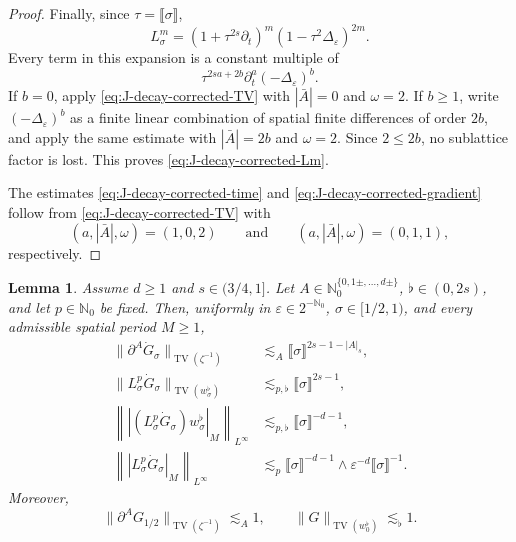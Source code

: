 \documentclass{article}
\numberwithin{equation}{section}
\theoremstyle{plain}
\newtheorem{lemma}[theorem]{Lemma}
\theoremstyle{definition}
\begin{document}
\begin{proof}
	Finally, since \(\tau=\llbracket\sigma\rrbracket\),
	\[
	L_\sigma^m
	=(1+\tau^{2s}\partial_t)^m
	(1-\tau^2\Delta_\varepsilon)^{2m}.
	\]
	Every term in this expansion is a constant multiple of
	\[
	\tau^{2sa+2b}
	\partial_t^a(-\Delta_\varepsilon)^b.
	\]
	If \(b=0\), apply \eqref{eq:J-decay-corrected-TV} with \(|\bar A|=0\) and
	\(\omega=2\).  If \(b\geq1\), write
	\((-\Delta_\varepsilon)^b\) as a finite linear combination of spatial
	finite differences of order \(2b\), and apply the same estimate with
	\(|\bar A|=2b\) and \(\omega=2\).  Since \(2\leq2b\), no sublattice factor is
	lost.  This proves \eqref{eq:J-decay-corrected-Lm}.
	
	The estimates \eqref{eq:J-decay-corrected-time} and
	\eqref{eq:J-decay-corrected-gradient} follow from
	\eqref{eq:J-decay-corrected-TV} with
	\[
	(a,|\bar A|,\omega)=(1,0,2)
	\qquad\text{and}\qquad
	(a,|\bar A|,\omega)=(0,1,1),
	\]
	respectively.
\end{proof}

\begin{lemma}
	\label{lem:Gdot-decay}
	Assume \(d\geq1\) and \(s\in(3/4,1]\).  Let
	\(A\in\mathbb N_0^{\{0,1\pm,\ldots,d\pm\}}\),
	\(\flat\in(0,2s)\), and let \(p\in\mathbb N_0\) be fixed.  Then,
	uniformly in \(\varepsilon\in2^{-\mathbb N_0}\),
	\(\sigma\in[1/2,1)\), and every admissible spatial period \(M\geq1\),
	\begin{align}
		\|\partial^A\dot G_\sigma\|_{\operatorname{TV}(\zeta^{-1})}
		&\lesssim_A
		\llbracket\sigma\rrbracket^{2s-1-|A|_s},
		\label{eq:Gdot-corrected-fixed-weight}
		\\
		\|L_\sigma^p\dot G_\sigma\|_{\operatorname{TV}(w_\sigma^\flat)}
		&\lesssim_{p,\flat}
		\llbracket\sigma\rrbracket^{2s-1},
		\label{eq:Gdot-corrected-weighted-TV}
		\\
		\left\|
		\left|(L_\sigma^p\dot G_\sigma)w_\sigma^\flat\right|_M
		\right\|_{L^\infty}
		&\lesssim_{p,\flat}
		\llbracket\sigma\rrbracket^{-d-1},
		\label{eq:Gdot-corrected-periodised-Linfty}
		\\
		\left\|\left|L_\sigma^p\dot G_\sigma\right|_M\right\|_{L^\infty}
		&\lesssim_p
		\llbracket\sigma\rrbracket^{-d-1}
		\wedge
		\varepsilon^{-d}\llbracket\sigma\rrbracket^{-1}.
		\label{eq:Gdot-corrected-periodised-unweighted}
	\end{align}
	Moreover,
	\begin{equation}
		\|\partial^A G_{1/2}\|_{\operatorname{TV}(\zeta^{-1})}
		\lesssim_A1,
		\qquad
		\|G\|_{\operatorname{TV}(w_0^\flat)}
		\lesssim_\flat1.
		\label{eq:Gdot-corrected-one-half}
	\end{equation}
\end{lemma}
\end{document}
